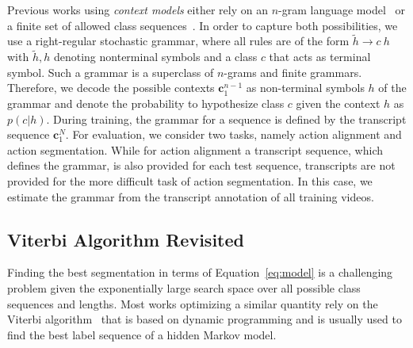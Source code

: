\documentclass[10pt,twocolumn,letterpaper]{article}
\begin{document}
Previous works using \textit{context models} either rely on an
$ n $-gram language model~\cite{richard2016temporal,koller2017resign} or a finite
set of allowed class sequences~\cite{kuehne2017weakly,richard2017weakly}. In order
to capture both possibilities, we use a right-regular stochastic grammar, where all rules
are of the form $ \tilde h \rightarrow c~h $ with $ \tilde h, h $ denoting nonterminal symbols and a class
$ c $ that acts as terminal symbol.
Such a grammar is a superclass of $ n $-grams and finite grammars. 
Therefore, we decode the possible contexts $ \mathbf{c}_1^{n-1} $ as non-terminal
symbols $ h $ of the grammar and denote the probability to hypothesize class $ c $
given the context $ h $ as $ p(c|h) $. During training, the grammar for a sequence is defined by the transcript sequence $\mathbf{c}_1^{N}$. For evaluation, we consider two tasks, namely action alignment and action segmentation. While for action alignment a transcript sequence, which defines the grammar, is also provided for each test sequence, transcripts are not provided for the more difficult task of action segmentation. In this case, we estimate the grammar from the transcript annotation of all training videos.




\subsection{Viterbi Algorithm Revisited}
\label{sec:viterbiRevisited}

Finding the best segmentation in terms of Equation~\eqref{eq:model} is a challenging
problem given the exponentially large search space over all possible class sequences
and lengths. Most works optimizing a similar quantity rely on the Viterbi algorithm~\cite{kuehne2017weakly,koller2016deephand,koller2017resign,richard2017weakly}
that is based on dynamic programming and is usually used to find the best label sequence
of a hidden Markov model.
\end{document}
